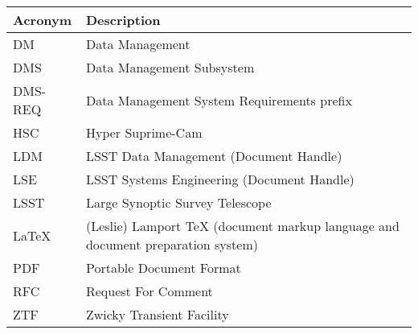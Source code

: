 \addtocounter{table}{-1}
\begin{longtable}{p{}p{}}\hline
\textbf{Acronym} & \textbf{Description}  \\\hline

DM & Data Management \\\hline
DMS & Data Management Subsystem \\\hline
DMS-REQ & Data Management System Requirements prefix \\\hline
HSC & Hyper Suprime-Cam \\\hline
LDM & LSST Data Management (Document Handle) \\\hline
LSE & LSST Systems Engineering (Document Handle) \\\hline
LSST & Large Synoptic Survey Telescope \\\hline
LaTeX & (Leslie) Lamport TeX (document markup language and document preparation system) \\\hline
PDF & Portable Document Format \\\hline
RFC & Request For Comment \\\hline
ZTF & Zwicky Transient Facility \\\hline
\end{longtable}
